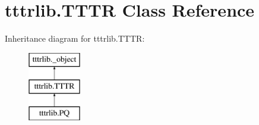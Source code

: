 \hypertarget{classtttrlib_1_1_t_t_t_r}{}\section{tttrlib.\+T\+T\+TR Class Reference}
\label{classtttrlib_1_1_t_t_t_r}
Inheritance diagram for tttrlib.\+T\+T\+TR\+:\begin{figure}[H]
\begin{center}
\leavevmode
\includegraphics[height=3.000000cm]{classtttrlib_1_1_t_t_t_r}
\end{center}
\end{figure}
